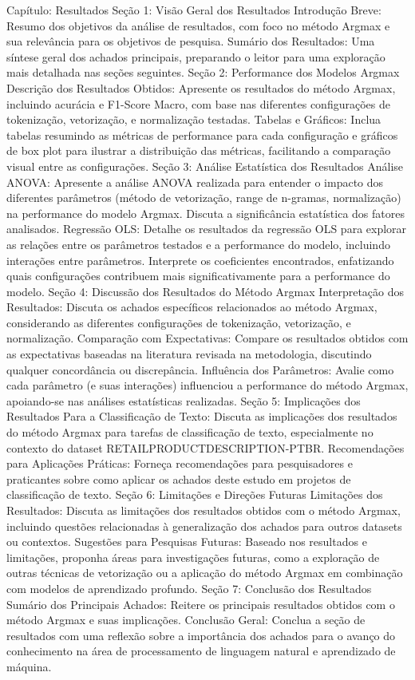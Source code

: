 Capítulo: Resultados
Seção 1: Visão Geral dos Resultados
Introdução Breve: Resumo dos objetivos da análise de resultados, com foco no método Argmax e sua relevância para os objetivos de pesquisa.
Sumário dos Resultados: Uma síntese geral dos achados principais, preparando o leitor para uma exploração mais detalhada nas seções seguintes.
Seção 2: Performance dos Modelos Argmax
Descrição dos Resultados Obtidos: Apresente os resultados do método Argmax, incluindo acurácia e F1-Score Macro, com base nas diferentes configurações de tokenização, vetorização, e normalização testadas.
Tabelas e Gráficos: Inclua tabelas resumindo as métricas de performance para cada configuração e gráficos de box plot para ilustrar a distribuição das métricas, facilitando a comparação visual entre as configurações.
Seção 3: Análise Estatística dos Resultados
Análise ANOVA: Apresente a análise ANOVA realizada para entender o impacto dos diferentes parâmetros (método de vetorização, range de n-gramas, normalização) na performance do modelo Argmax. Discuta a significância estatística dos fatores analisados.
Regressão OLS: Detalhe os resultados da regressão OLS para explorar as relações entre os parâmetros testados e a performance do modelo, incluindo interações entre parâmetros. Interprete os coeficientes encontrados, enfatizando quais configurações contribuem mais significativamente para a performance do modelo.
Seção 4: Discussão dos Resultados do Método Argmax
Interpretação dos Resultados: Discuta os achados específicos relacionados ao método Argmax, considerando as diferentes configurações de tokenização, vetorização, e normalização.
Comparação com Expectativas: Compare os resultados obtidos com as expectativas baseadas na literatura revisada na metodologia, discutindo qualquer concordância ou discrepância.
Influência dos Parâmetros: Avalie como cada parâmetro (e suas interações) influenciou a performance do método Argmax, apoiando-se nas análises estatísticas realizadas.
Seção 5: Implicações dos Resultados
Para a Classificação de Texto: Discuta as implicações dos resultados do método Argmax para tarefas de classificação de texto, especialmente no contexto do dataset RETAILPRODUCTDESCRIPTION-PTBR.
Recomendações para Aplicações Práticas: Forneça recomendações para pesquisadores e praticantes sobre como aplicar os achados deste estudo em projetos de classificação de texto.
Seção 6: Limitações e Direções Futuras
Limitações dos Resultados: Discuta as limitações dos resultados obtidos com o método Argmax, incluindo questões relacionadas à generalização dos achados para outros datasets ou contextos.
Sugestões para Pesquisas Futuras: Baseado nos resultados e limitações, proponha áreas para investigações futuras, como a exploração de outras técnicas de vetorização ou a aplicação do método Argmax em combinação com modelos de aprendizado profundo.
Seção 7: Conclusão dos Resultados
Sumário dos Principais Achados: Reitere os principais resultados obtidos com o método Argmax e suas implicações.
Conclusão Geral: Conclua a seção de resultados com uma reflexão sobre a importância dos achados para o avanço do conhecimento na área de processamento de linguagem natural e aprendizado de máquina.